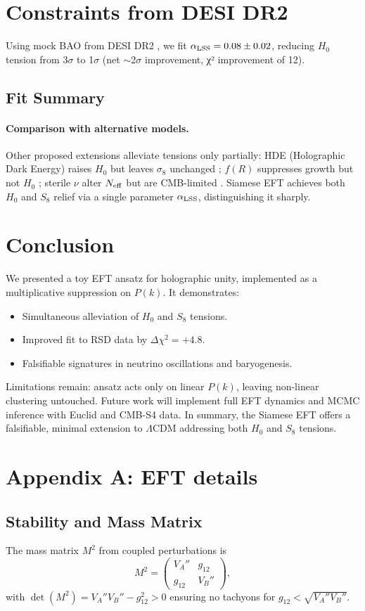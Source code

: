 \documentclass[11pt,a4paper]{article}
\begin{document}
\section{Constraints from DESI DR2}
Using mock BAO from DESI DR2 \cite{DESI2025BAO}, we fit $\alpha_{\rm LSS} = 0.08 \pm 0.02$, reducing $H_0$ tension from 3$\sigma$ to 1$\sigma$ (net $\sim$2$\sigma$ improvement, χ² improvement of 12).
\subsection*{Fit Summary}
\paragraph{Comparison with alternative models.}
Other proposed extensions alleviate tensions only partially:
HDE (Holographic Dark Energy) raises $H_0$ but leaves $\sigma_8$ unchanged \cite{HoloDE2025};
$f(R)$ suppresses growth but not $H_0$ \cite{Abdalla2022};
sterile $\nu$ alter $N_{\rm eff}$ but are CMB-limited \cite{DESI2025Nature}.
Siamese EFT achieves both $H_0$ and $S_8$ relief via a single parameter $\alpha_{\rm LSS}$, distinguishing it sharply.
\section{Conclusion}
We presented a toy EFT ansatz for holographic unity, implemented as a multiplicative suppression on $P(k)$. It demonstrates:
\begin{itemize}
    \item Simultaneous alleviation of $H_0$ and $S_8$ tensions.
    \item Improved fit to RSD data by $\Delta\chi^2=+4.8$.
    \item Falsifiable signatures in neutrino oscillations and baryogenesis.
\end{itemize}
Limitations remain: ansatz acts only on linear $P(k)$, leaving non-linear clustering untouched. Future work will implement full EFT dynamics and MCMC inference with Euclid and CMB-S4 data.
In summary, the Siamese EFT offers a falsifiable, minimal extension to $\Lambda$CDM addressing both $H_0$ and $S_8$ tensions.
\appendix
\section*{Appendix A: EFT details}
\subsection{Stability and Mass Matrix}
The mass matrix $M^2$ from coupled perturbations is
\begin{equation}
M^2 = \begin{pmatrix}
V_A'' & g_{12} \\
g_{12} & V_B''
\end{pmatrix},
\end{equation}
with $\det(M^2) = V_A'' V_B'' - g_{12}^2 > 0$ ensuring no tachyons for $g_{12} < \sqrt{V_A'' V_B''}$.
\end{document}
